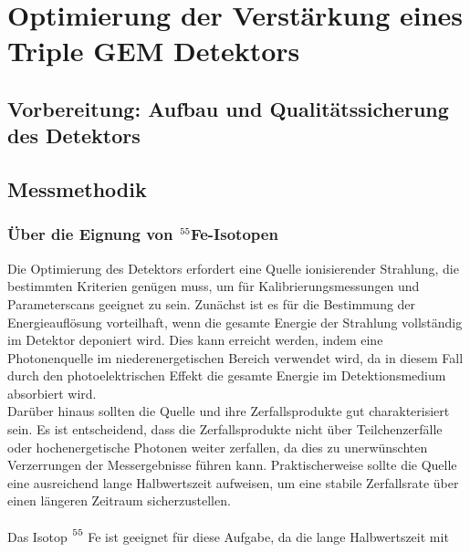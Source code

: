 \chapter{Optimierung der Verstärkung eines Triple GEM Detektors}
	\section{Vorbereitung: Aufbau und Qualitätssicherung des Detektors}
	
	\section{Messmethodik}
		\subsection{Über die Eignung von $\ce{^{55}}$Fe-Isotopen}
			Die Optimierung des Detektors erfordert eine Quelle ionisierender Strahlung, die bestimmten Kriterien genügen muss, um für Kalibrierungsmessungen und Parameterscans geeignet zu sein. Zunächst ist es für die Bestimmung der Energieauflösung vorteilhaft, wenn die gesamte Energie der Strahlung vollständig im Detektor deponiert wird. Dies kann erreicht werden, indem eine Photonenquelle im niederenergetischen Bereich verwendet wird, da in diesem Fall durch den photoelektrischen Effekt die gesamte Energie im Detektionsmedium absorbiert wird.\\
			Darüber hinaus sollten die Quelle und ihre Zerfallsprodukte gut charakterisiert sein. Es ist entscheidend, dass die Zerfallsprodukte nicht über Teilchenzerfälle oder hochenergetische Photonen weiter zerfallen, da dies zu unerwünschten Verzerrungen der Messergebnisse führen kann. Praktischerweise sollte die Quelle eine ausreichend lange Halbwertszeit aufweisen, um eine stabile Zerfallsrate über einen längeren Zeitraum sicherzustellen.\\
			\\
			Das Isotop $\ce{^55}$ Fe ist geeignet für diese Aufgabe, da die lange Halbwertszeit mit 
			
			
			
			
